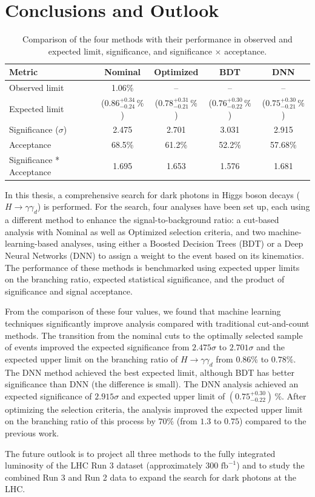 \FloatBarrier
\section{Conclusions and Outlook}


\begin{table}[htbp]
\centering
\caption{Comparison of the four methods with their performance in observed and expected limit, significance, and significance $\times$ acceptance.}
\label{tab:analysis_comparison}
\begin{tabular}{lcccc}
    \toprule
    \textbf{Metric} & \textbf{Nominal} & \textbf{Optimized} & \textbf{BDT} & \textbf{DNN} \\
    \midrule
    Observed limit & 1.06\% & -- & -- & -- \\
    Expected limit & ($0.86^{+0.34}_{-0.24}\,\%$) & ($0.78^{+0.31}_{-0.21}\,\%$) & ($0.76^{+0.30}_{-0.22}\,\%$) & ($0.75^{+0.30}_{-0.21}\,\%$) \\
    Significance ($\sigma$) & 2.475 & 2.701 & 3.031 & 2.915 \\
    Acceptance & 68.5\% & 61.2\% & 52.2\% & 57.68\% \\
    Significance * Acceptance & 1.695 & 1.653 & 1.576 & 1.681 \\
    \bottomrule
\end{tabular}
\end{table}



In this thesis, a comprehensive search for dark photons in Higgs boson decays ($H \to \gamma\gamma_d$) is performed. For the search, four analyses have been set up, each using a different method to enhance the signal-to-background ratio: a cut-based analysis with Nominal as well as Optimized selection criteria, and two machine-learning-based analyses, using either a Boosted Decision Trees (BDT) or a Deep Neural Networks (DNN) to assign a weight to the event based on its kinematics. The performance of these methods is benchmarked using expected upper limits on the branching ratio, expected statistical significance, and the product of significance and signal acceptance.

From the comparison of these four values, we found that machine learning techniques significantly improve analysis compared with traditional cut-and-count methods. The transition from the nominal cuts to the optimally selected sample of events improved the expected significance from $2.475\sigma$ to $2.701\sigma$ and the expected upper limit on the branching ratio of $H \to \gamma\gamma_d$ from $0.86\%$ to $0.78\%$. The DNN method achieved the best expected limit, although BDT has better significance than DNN (the difference is small). The DNN analysis achieved an expected significance of $2.915\sigma$ and expected upper limit of $(0.75^{+0.30}_{-0.22})\,\%$. After optimizing the selection criteria, the analysis improved the expected upper limit on the branching ratio of this process by $70\%$ (from $1.3$ to $0.75$) compared to the previous work. 

The future outlook is to project all three methods to the fully integrated 
luminosity of the LHC Run 3 dataset (approximately $300\text{ fb}^{-1}$) 
and to study the combined Run 3 and Run 2 data to expand the search for 
dark photons at the LHC.